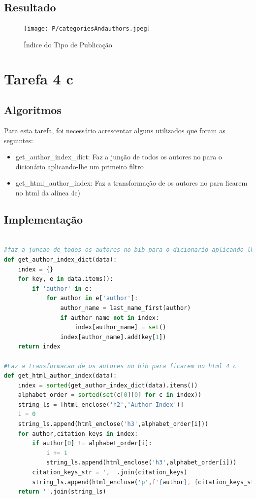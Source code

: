 \documentclass[11pt,a4paper]{report}
\begin{document}
\subsection{Resultado}

\begin{figure}[h]
\centering
\texttt{[image: P/categoriesAndauthors.jpeg]}
\caption{Índice do Tipo de Publicação}
\end{figure}

\section{Tarefa 4 c}

\subsection{Algoritmos}
Para esta tarefa, foi necessário acrescentar alguns utilizados  que foram as seguintes:

\begin{itemize}
    \item get\_author\_index\_dict: Faz a junção de todos os autores no \bib para o dicionário aplicando-lhe um primeiro filtro
    \item get\_html\_author\_index: Faz a transformação de os autores no \bib para ficarem no html da alínea 4c)

\end{itemize}
\subsection{Implementação}
\begin{lstlisting}[language=python]

#faz a juncao de todos os autores no bib para o dicionario aplicando lhe um primeiro filtro
def get_author_index_dict(data):
    index = {}
    for key, e in data.items():
        if 'author' in e:
            for author in e['author']:
                author_name = last_name_first(author)
                if author_name not in index:
                    index[author_name] = set()
                index[author_name].add(key[1])
    return index

#Faz a transformacao de os autores no bib para ficarem no html 4 c
def get_html_author_index(data):
    index = sorted(get_author_index_dict(data).items())
    alphabet_order = sorted(set(c[0][0] for c in index))
    string_ls = [html_enclose('h2','Author Index')]
    i = 0
    string_ls.append(html_enclose('h3',alphabet_order[i]))
    for author,citation_keys in index:
        if author[0] != alphabet_order[i]:
            i += 1
            string_ls.append(html_enclose('h3',alphabet_order[i]))
        citation_keys_str = ', '.join(citation_keys)
        string_ls.append(html_enclose('p',f'{author}, {citation_keys_str}'))
    return ''.join(string_ls)
\end{lstlisting}
\end{document}

